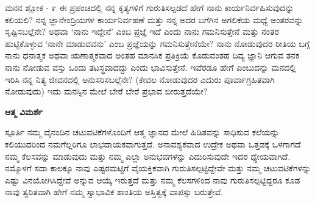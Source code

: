 \newpage

\begin{mananam}{\mananamfont \large ಮನನ ಶ್ಲೋಕ - ೯}
\mananamtext ಈ ಪ್ರಪಂಚದಲ್ಲಿ ನನ್ನ ಕೃತ್ಯಗಳಿಗೆ ಗುರುತಿಸಲ್ಪಡದೆ ಹೇಗೆ ನಾನು ಕಾರ್ಯನಿರ್ವಹಿಸುವುದನ್ನು ಕಲಿಯಲಿ? ನನ್ನ ಜ್ಞಾನೇಂದ್ರಿಯಗಳ ಕಾರ್ಯನಿರ್ವಹಣೆ ಮತ್ತು ನನ್ನ ಅದರ ಬಗೆಗಿನ ಅಗಲಿಕೆಯ ಮಧ್ಯೆ ಅಂತರವನ್ನು ಸೃಷ್ಟಿಸಬಲ್ಲೆನೇ? ಅಥವಾ ‘ನಾನು ಇದ್ದೇನೆ’ ಎಂಬ ಪ್ರಜ್ಞೆ ಇದೆ ಎಂದು ನಾನು ಗಮನಿಸುತ್ತೇನೆ ಮತ್ತು ನಂತರ ಹುಟ್ಟಿಕೊಳ್ಳುವ ‘ನಾನೇ ಮಾಡುವವನು’ ಎಂಬ ಪ್ರಜ್ಞೆಯನ್ನು ಗಮನಿಸುತ್ತೇನೆಯೇ? ನಾನು ನೋಡುವುದರ ರೀತಿಯ ಬಗ್ಗೆ ನಾನು ಧನಾತ್ಮಕ ಅಥವಾ ಋಣಾತ್ಮಕವಾದ ಅಂತಹ ಮಾನಸಿಕ ಪ್ರತಿಕ್ರಿಯೆ ಕೊಡುವಂತಹ ದಿವ್ಯ ಜ್ಞಾನಿ ಆಗುವ ತನಕ ನಾನು ನೋಡುವ ವಸ್ತು ಒಂದು ತಟಸ್ಥವಾದದ್ದು  ಎಂದು ಭಾವಿಸುತ್ತೇನೆ. ಇವೆರಡೂ ಹೇಗೆ ಎಂಬುದನ್ನು ಮನದಲ್ಲಿ ಇರಿಸಿ ನನ್ನ ನಿತ್ಯ ಜೀವನದಲ್ಲಿ ಅನುಸರಿಸಬಲ್ಲೆನೇ? (ಕೇವಲ ನೋಡುವುದರ ಎದುರು ಪೂರ್ವಾಗ್ರಹಿತವಾಗಿ ನೋಡುವುದು) ಇದು ಮನಸ್ಸಿನ ಮೇಲೆ ಬೇರೆ ಬೇರೆ ಪ್ರಭಾವ ಬೀರುತ್ತದೆಯೇ?
\end{mananam}
\WritingHand\enspace\textbf{ಆತ್ಮ ವಿಮರ್ಶೆ}\\
\begin{inspiration}{\mananamfont \large ಸ್ಪೂರ್ತಿ}
\mananamtext ನಮ್ಮ ದೈನಂದಿನ ಚಟುವಟಿಕೆಗಳೊಂದಿಗೆ ಆತ್ಮ ಜ್ಞಾನದ ಮೇಲೆ ಹಿಡಿತವನ್ನು ಸಾಧಿಸುವ ಕಲೆಯನ್ನು ಕಲಿಯುದರಿಂದ ನಮಗೆಲ್ಲರಿಗೂ ಲಾಭದಾಯಕವಾಗುತ್ತದೆ. ಅನಾವಶ್ಯಕವಾದ ಉದ್ರೇಕ ಅಥವಾ ಒತ್ತಡಕ್ಕೆ ಒಳಗಾಗದೆ ನಮ್ಮ ಕೆಲಸವನ್ನು ಮಾಡುವುದು ಮತ್ತು ನಮ್ಮ ಎಲ್ಲಾ ಅನುಭವಗಳನ್ನು ಎದುರಿಸುವುದೇ ಇದರ ಧ್ಯೇಯವಾಗಿದೆ. ನಮ್ಮೊಳಗೆ ಸದಾ ಕಾಲಕ್ಕೂ ನಾವು ಎಷ್ಟರಮಟ್ಟಿಗೆ ವೈಯಕ್ತಿಕವಾಗಿ ಗುರುತಿಸಲ್ಪಟ್ಟಿದ್ದೇವೇ ಮತ್ತು ನಮ್ಮ ಚಟುವಟಿಕೆಗಳನ್ನು ಎಷ್ಟು ವಿನಯೋಗಿಸಿದ್ದೇವೆ ಅನ್ನುವ ಆಯ್ಕೆ ಇರುತ್ತದೆ ಮತ್ತು ನಮ್ಮ ಕೆಲಸಗಳಿಂದ ನಾವು ಗುರುತಿಸಲ್ಪಟ್ಟಿದ್ದರೂ ಕೂಡ ನಾವು ತ್ವರಿತವಾಗಿ ಹೇಗೆ ನಮ್ಮ ಸ್ವಾಭಾವಿಕ ಶಾಂತಿಯ ಅಸ್ತಿತ್ವಕ್ಕೆ ವಾಪಸ್ಸು ಬರುತ್ತೇವೆ.
\end{inspiration}
\newpage


